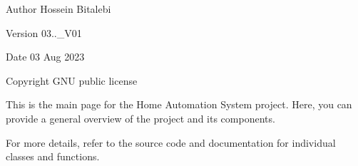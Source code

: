 \begin{DoxyAuthor}{Author}
Hossein Bitalebi 
\end{DoxyAuthor}
\begin{DoxyVersion}{Version}
03..\+\_\+\+V01 
\end{DoxyVersion}
\begin{DoxyDate}{Date}
03 Aug 2023 
\end{DoxyDate}
\begin{DoxyCopyright}{Copyright}
G\+NU public license
\end{DoxyCopyright}
This is the main page for the Home Automation System project. Here, you can provide a general overview of the project and its components.

For more details, refer to the source code and documentation for individual classes and functions. 